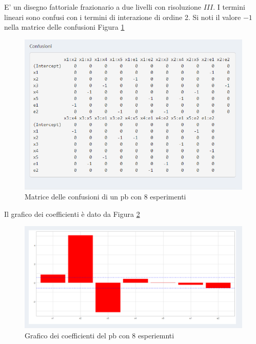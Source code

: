\documentclass[
  11pt,
]{book}
\begin{document}
E' un disegno fattoriale frazionario a due livelli con risoluzione \(III\). I termini lineari sono confusi con i termini di interazione di ordine 2. Si noti il valore \(-1\) nella matrice delle confusioni Figura \ref{fig:pb6}

\begin{figure}[ht]

{\centering \includegraphics[width=1\linewidth]{Immagini/PB/06_confusioni8} 

}

\caption{Matrice delle confusioni di un pb con 8 esperimenti}\label{fig:pb6}
\end{figure}

Il grafico dei coefficienti è dato da Figura \ref{fig:pb7}

\begin{figure}[ht]

{\centering \includegraphics[width=1\linewidth]{Immagini/PB/07_coeff8} 

}

\caption{Grafico dei coefficienti del pb con 8 esperiemnti}\label{fig:pb7}
\end{figure}
\newpage
\end{document}
